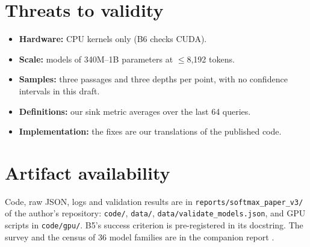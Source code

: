 \documentclass[10pt]{article}
\begin{document}
\section{Threats to validity}
\begin{itemize}[leftmargin=*,itemsep=1pt]
\item \textbf{Hardware:} CPU kernels only (B6 checks CUDA).
\item \textbf{Scale:} models of 340M--1B parameters at $\leq$8,192 tokens.
\item \textbf{Samples:} three passages and three depths per point, with no confidence intervals in this draft.
\item \textbf{Definitions:} our sink metric averages over the last 64 queries.
\item \textbf{Implementation:} the fixes are our translations of the published code.
\end{itemize}

\section{Artifact availability}\label{sec:artifact}
Code, raw JSON, logs and validation results are in \texttt{reports/softmax\_paper\_v3/} of the author's repository: \texttt{code/}, \texttt{data/}, \texttt{data/validate\_models.json}, and GPU scripts in \texttt{code/gpu/}. B5's success criterion is pre-registered in its docstring. The survey and the census of 36 model families are in the companion report \citep{v2report}.



\end{document}
